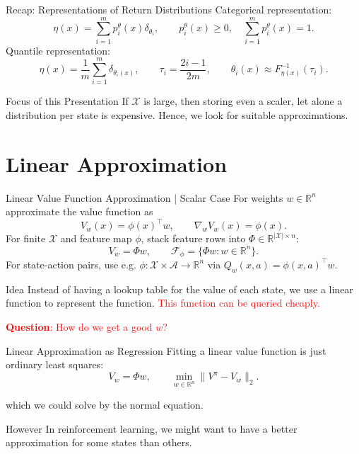 \documentclass[10pt]{beamer}
\newcommand{\R}{\mathbb{R}}
\newcommand{\X}{\mathcal{X}}
\newcommand{\A}{\mathcal{A}}
\newcommand{\F}{\mathcal{F}}
\newcommand{\1}{\mathds{1}}
\newcommand{\norm}[1]{\lVert#1\rVert}
\begin{document}
\begin{frame}{Recap: Representations of Return Distributions}
  Categorical representation:
  \[
    \eta(x)=\sum_{i=1}^m p_i^\theta(x)\delta_{\theta_i},
    \qquad
    p^\theta_i(x)\geq0,\quad \sum_{i=1}^m p_i^\theta(x)=1.
  \]
  Quantile representation:
  \[
    \eta(x)=\frac1m\sum_{i=1}^m\delta_{\theta_i(x)},
    \qquad
    \tau_i=\frac{2i-1}{2m},
    \qquad
    \theta_i(x)\approx F_{\eta(x)}^{-1}(\tau_i).
  \]
  \begin{block}{Focus of this Presentation} 
    If $\mathcal{X}$ is large, then storing even a scaler, let alone a distribution per state is expensive. 
    Hence, we look for suitable approximations.
  \end{block}
\end{frame}

\section{Linear Approximation}

\begin{frame}{Linear Value Function Approximation | Scalar Case}
  For weights $w\in\R^n$ approximate the value function as
  \[
    V_w(x)=\phi(x)^\top w,
    \qquad
    \nabla_w V_w(x)=\phi(x).
  \]
  For finite $\X$ and feature map $\phi$, stack feature rows into $\Phi\in\R^{|\X|\times n}$:
  \[
    V_w=\Phi w,
    \qquad
    \F_\phi=\{\Phi w:w\in\R^n\}.
  \]
  For state-action pairs, use e.g. $\phi:\X\times\A\to\R^n$ via
  $Q_w(x,a)=\phi(x,a)^\top w$.
  \begin{block}{Idea} 
    Instead of having a lookup table for the value of each state, we use a linear function to represent the function.
    \textcolor{red}{This function can be queried cheaply. }
  \end{block}

  \pause
  {\large\textcolor{red}{\textbf{Question}: How do we get a good $w$?}}
\end{frame}

\begin{frame}{Linear Approximation as Regression}
  Fitting a linear value function is just ordinary least squares:
  \[
    V_w=\Phi w,
    \qquad
    \min_{w\in\R^n}\norm{V^\pi-V_w}_{2}.
  \]

  which we could solve by the normal equation. 

  \begin{block}{However}
    In reinforcement learning, we might want to have a better approximation for some states than others.  
  \end{block}
\end{frame}
\end{document}
